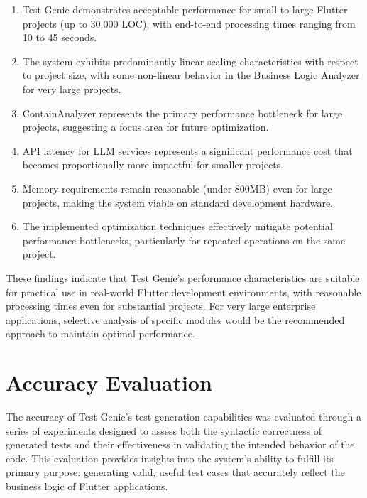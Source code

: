 \begin{enumerate}
    \item Test Genie demonstrates acceptable performance for small to large Flutter projects (up to 30,000 LOC), with end-to-end processing times ranging from 10 to 45 seconds.
    
    \item The system exhibits predominantly linear scaling characteristics with respect to project size, with some non-linear behavior in the Business Logic Analyzer for very large projects.
    
    \item ContainAnalyzer represents the primary performance bottleneck for large projects, suggesting a focus area for future optimization.
    
    \item API latency for LLM services represents a significant performance cost that becomes proportionally more impactful for smaller projects.
    
    \item Memory requirements remain reasonable (under 800MB) even for large projects, making the system viable on standard development hardware.
    
    \item The implemented optimization techniques effectively mitigate potential performance bottlenecks, particularly for repeated operations on the same project.
\end{enumerate}

These findings indicate that Test Genie's performance characteristics are suitable for practical use in real-world Flutter development environments, with reasonable processing times even for substantial projects. For very large enterprise applications, selective analysis of specific modules would be the recommended approach to maintain optimal performance.

\section{Accuracy Evaluation}

The accuracy of Test Genie's test generation capabilities was evaluated through a series of experiments designed to assess both the syntactic correctness of generated tests and their effectiveness in validating the intended behavior of the code. This evaluation provides insights into the system's ability to fulfill its primary purpose: generating valid, useful test cases that accurately reflect the business logic of Flutter applications.


